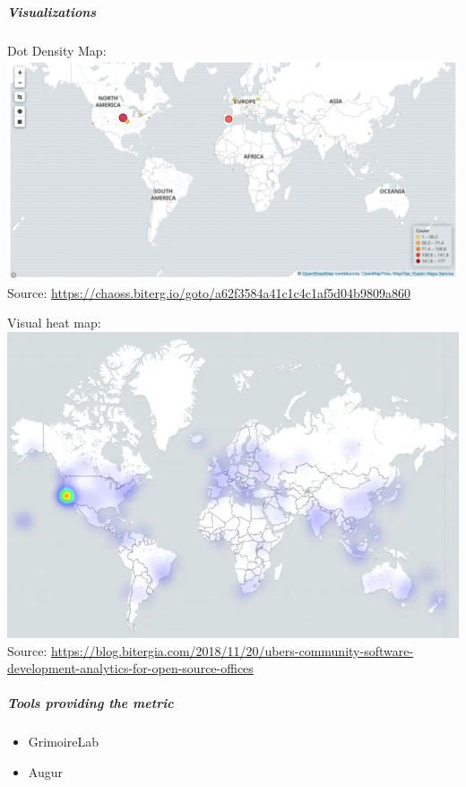 \hypertarget{visualizations}{%
\subparagraph{Visualizations}\label{visualizations}}

Dot Density Map:
\includegraphics{images/contributor-location_dot-density-map.png}
Source:
\href{https://chaoss.biterg.io/goto/a62f3584a41c1c4c1af5d04b9809a860}{https://chaoss.biterg.io/goto/a62f3584a41c1c4c1af5d04b9809a860}

Visual heat map:
\includegraphics{images/contributor-location_heatmap.png} Source:
\href{https://blog.bitergia.com/2018/11/20/ubers-community-software-development-analytics-for-open-source-offices}{https://blog.bitergia.com/2018/11/20/ubers-community-software-development-analytics-for-open-source-offices}

\hypertarget{tools-providing-the-metric}{%
\subparagraph{Tools providing the
metric}\label{tools-providing-the-metric}}

\begin{itemize}
\tightlist
\item
  GrimoireLab
\item
  Augur
\end{itemize}

